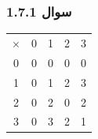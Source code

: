 \documentclass{article}
\begin{document}
\subsubsection{سوال 1.7.1}
\begin{latin}
\begin{table}[H]
\centering
\begin{tabular}{ccccc}
$\times$               & 0                      & 1                      & 2                      & 3                      \\ \cline{2-5} 
\multicolumn{1}{c|}{0} & \multicolumn{1}{c|}{0} & \multicolumn{1}{c|}{0} & \multicolumn{1}{c|}{0} & \multicolumn{1}{c|}{0} \\ \cline{2-5} 
\multicolumn{1}{c|}{1} & \multicolumn{1}{c|}{0} & \multicolumn{1}{c|}{1} & \multicolumn{1}{c|}{2} & \multicolumn{1}{c|}{3} \\ \cline{2-5} 
\multicolumn{1}{c|}{2} & \multicolumn{1}{c|}{0} & \multicolumn{1}{c|}{2} & \multicolumn{1}{c|}{0} & \multicolumn{1}{c|}{2} \\ \cline{2-5} 
\multicolumn{1}{c|}{3} & \multicolumn{1}{c|}{0} & \multicolumn{1}{c|}{3} & \multicolumn{1}{c|}{2} & \multicolumn{1}{c|}{1} \\ \cline{2-5} 
\end{tabular}
\end{table}
\end{latin}
\end{document}
